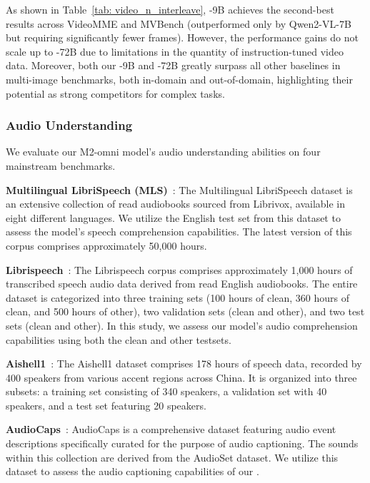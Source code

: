 As shown in Table~\ref{tab: video_n_interleave}, \method-9B achieves the second-best results across VideoMME and MVBench (outperformed only by Qwen2-VL-7B but requiring significantly fewer frames). However, the performance gains do not scale up to \method-72B due to limitations in the quantity of instruction-tuned video data. Moreover, both our \method-9B and \method-72B greatly surpass all other baselines in multi-image benchmarks, both in-domain and out-of-domain, highlighting their potential as strong competitors for complex tasks.


\subsubsection{Audio Understanding}

We evaluate our M2-omni model's audio understanding abilities on four mainstream benchmarks.

\textbf{Multilingual LibriSpeech (MLS)}~\cite{MLS_English}: The Multilingual LibriSpeech dataset is an extensive collection of read audiobooks sourced from Librivox, available in eight different languages. We utilize the English test set from this dataset to assess the model's speech comprehension capabilities. The latest version of this corpus comprises approximately 50,000 hours.

\textbf{Librispeech}~\cite{Librispeech}: The Librispeech corpus comprises approximately 1,000 hours of transcribed speech audio data derived from read English audiobooks. The entire dataset is categorized into three training sets (100 hours of clean, 360 hours of clean, and 500 hours of other), two validation sets (clean and other), and two test sets (clean and other). In this study, we assess our model's audio comprehension capabilities using both the clean and other testsets.

\textbf{Aishell1}~\cite{AISHELL1}:  The Aishell1 dataset comprises 178 hours of speech data, recorded by 400 speakers from various accent regions across China. It is organized into three subsets: a training set consisting of 340 speakers, a validation set with 40 speakers, and a test set featuring 20 speakers.

\textbf{AudioCaps}~\cite{AudioCaps}: AudioCaps is a comprehensive dataset featuring audio event descriptions specifically curated for the purpose of audio captioning. The sounds within this collection are derived from the AudioSet dataset. We utilize this dataset to assess the audio captioning capabilities of our \method.

